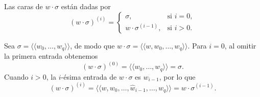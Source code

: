 \begin{lema}
Las caras de $w \cdot \sigma$ están dadas por
\[
(w \cdot \sigma)^{(i)} =
\begin{cases}
    \sigma, & \text{si } i = 0, \\
    w \cdot \sigma^{(i-1)}, & \text{si } i > 0.
\end{cases}
\]
\end{lema}

\begin{dem}
Sea $\sigma = \langle\!\langle w_0, \dots, w_q \rangle\!\rangle$, de modo que $w \cdot \sigma = \langle\!\langle w, w_0, \dots, w_q \rangle\!\rangle$. Para $i = 0$, al omitir la primera entrada obtenemos
\[
(w \cdot \sigma)^{(0)} = \langle\!\langle w_0, \dots, w_q \rangle\!\rangle = \sigma.
\]
Cuando $i > 0$, la $i$-ésima entrada de $w \cdot \sigma$ es $w_{i-1}$, por lo que
\[
(w \cdot \sigma)^{(i)} = \langle\!\langle w, w_0, \dots, \hat{w}_{i-1}, \dots, w_q \rangle\!\rangle = w \cdot \sigma^{(i-1)}.
\]
\end{dem}

